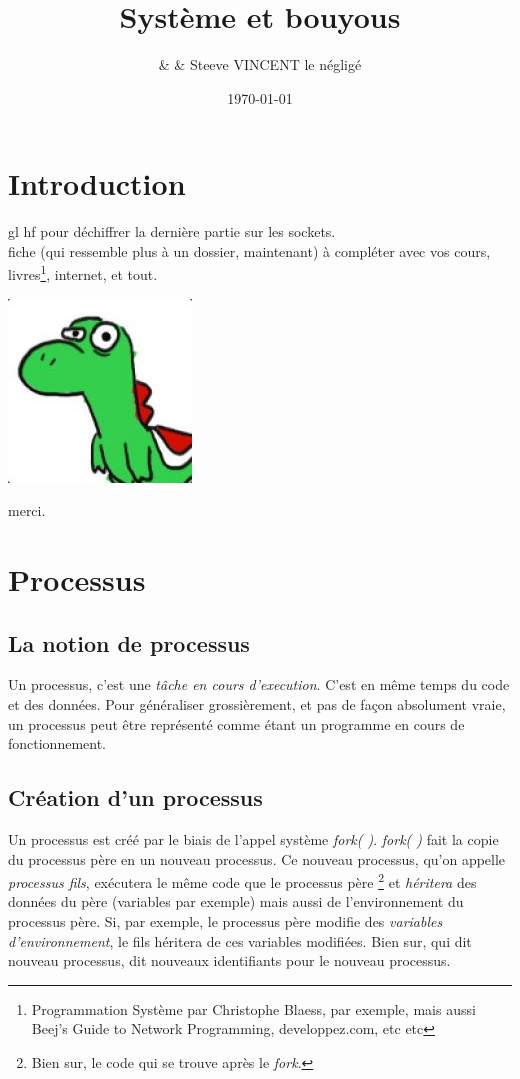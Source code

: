\documentclass{report}
\title{Système et bouyous}
\author{\bsc{Borey UK} \& \bsc{Elias MIA} \&  Steeve VINCENT le négligé}
\date{\today}
\begin{document}
\maketitle{}

\chapter*{Introduction}
gl hf pour déchiffrer la dernière partie sur les sockets.\\
fiche (qui ressemble plus à un dossier, maintenant) à compléter avec vos cours, livres\footnote{Programmation Système par Christophe Blaess, par exemple, mais aussi Beej's Guide to Network Programming, developpez.com, etc etc}, internet, et tout.\\
\begin{center}
\includegraphics[scale=1]{moi}
\end{center}
\begin{center}
merci.
\end{center}


\chapter{Processus}
\section{La notion de processus}
Un processus, c'est une \emph{tâche en cours d'execution}. C'est en même temps du code et des données. Pour généraliser grossièrement, et pas de façon absolument vraie, un processus peut être représenté comme étant un programme en cours de fonctionnement.

\section{Création d'un processus}
Un processus est créé par le biais de l'appel système \emph{fork( )}. \emph{fork( )} fait la copie du processus père en un nouveau processus. Ce nouveau processus, qu'on appelle \emph{processus fils}, exécutera le même code que le processus père \footnote{Bien sur, le code qui se trouve après le \emph{fork}.} et \emph{héritera} des données du père (variables par exemple) mais aussi de l'environnement du processus père. Si, par exemple, le processus père modifie des \emph{variables d'environnement}, le fils héritera de ces variables modifiées.
Bien sur, qui dit nouveau processus, dit nouveaux identifiants pour le nouveau processus.
\end{document}
